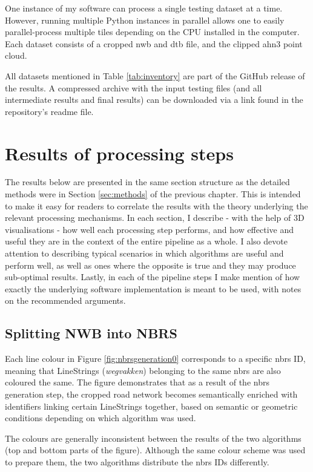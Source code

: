 One instance of my software can process a single testing dataset at a time. However, running multiple Python instances in parallel allows one to easily parallel-process multiple tiles depending on the CPU installed in the computer. Each dataset consists of a cropped \ac{nwb} and \ac{dtb} file, and the clipped \ac{ahn3} point cloud.

All datasets mentioned in Table \ref{tab:inventory} are part of the GitHub release of the results. A compressed archive with the input testing files (and all intermediate results and final results) can be downloaded via a link found in the repository's readme file.

\section{Results of processing steps}
\label{sec:results}

The results below are presented in the same section structure as the detailed methods were in Section \ref{sec:methods} of the previous chapter. This is intended to make it easy for readers to correlate the results with the theory underlying the relevant processing mechanisms. In each section, I describe - with the help of 3D visualisations - how well each processing step performs, and how effective and useful they are in the context of the entire pipeline as a whole. I also devote attention to describing typical scenarios in which algorithms are useful and perform well, as well as ones where the opposite is true and they may produce sub-optimal results. Lastly, in each of the pipeline steps I make mention of how exactly the underlying software implementation is meant to be used, with notes on the recommended arguments.

\subsection{Splitting NWB into NBRS}
\label{sub:r_nbrsgeneration}

Each line colour in Figure \ref{fig:nbrsgeneration0} corresponds to a specific \ac{nbrs} ID, meaning that LineStrings (\textit{wegvakken}) belonging to the same \ac{nbrs} are also coloured the same. The figure demonstrates that as a result of the \ac{nbrs} generation step, the cropped road network becomes semantically enriched with identifiers linking certain LineStrings together, based on semantic or geometric conditions depending on which algorithm was used.

The colours are generally inconsistent between the results of the two algorithms (top and bottom parts of the figure). Although the same colour scheme was used to prepare them, the two algorithms distribute the \ac{nbrs} IDs differently.

